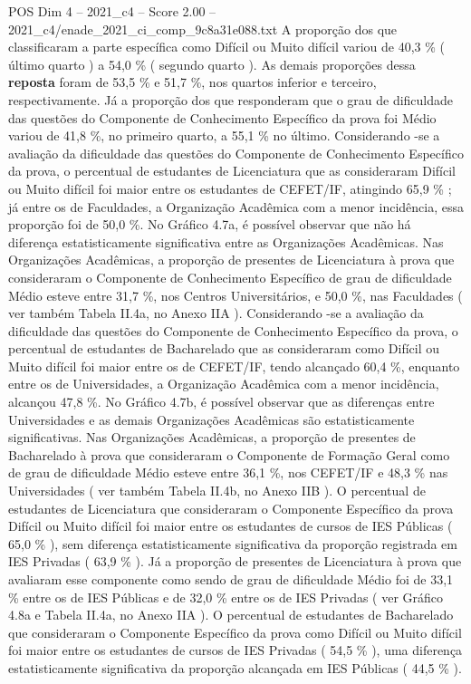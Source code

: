 \begin{textsample}{POS Dim 4 – 2021\_c4 – Score 2.00 – 2021\_c4/enade\_2021\_ci\_comp\_9c8a31e088.txt}
A proporção dos que classificaram a parte específica como Difícil ou Muito difícil variou de 40,3 \% ( último quarto ) a 54,0 \% ( segundo quarto ).
As demais proporções dessa \textbf{reposta} foram de 53,5 \% e 51,7 \%, nos quartos inferior e terceiro, respectivamente.
Já a proporção dos que responderam que o grau de dificuldade das questões do Componente de Conhecimento Específico da prova foi Médio variou de 41,8 \%, no primeiro quarto, a 55,1 \% no último.
Considerando -se a avaliação da dificuldade das questões do Componente de Conhecimento Específico da prova, o percentual de estudantes de Licenciatura que as consideraram Difícil ou Muito difícil foi maior entre os estudantes de CEFET/IF, atingindo 65,9 \% ; já entre os de Faculdades, a Organização Acadêmica com a menor incidência, essa proporção foi de 50,0 \%.
No Gráfico 4.7a, é possível observar que não há diferença estatisticamente significativa entre as Organizações Acadêmicas.
Nas Organizações Acadêmicas, a proporção de presentes de Licenciatura à prova que consideraram o Componente de Conhecimento Específico de grau de dificuldade Médio esteve entre 31,7 \%, nos Centros Universitários, e 50,0 \%, nas Faculdades ( ver também Tabela II.4a, no Anexo IIA ).
Considerando -se a avaliação da dificuldade das questões do Componente de Conhecimento Específico da prova, o percentual de estudantes de Bacharelado que as consideraram como Difícil ou Muito difícil foi maior entre os de CEFET/IF, tendo alcançado 60,4 \%, enquanto entre os de Universidades, a Organização Acadêmica com a menor incidência, alcançou 47,8 \%.
No Gráfico 4.7b, é possível observar que as diferenças entre Universidades e as demais Organizações Acadêmicas são estatisticamente significativas.
Nas Organizações Acadêmicas, a proporção de presentes de Bacharelado à prova que consideraram o Componente de Formação Geral como de grau de dificuldade Médio esteve entre 36,1 \%, nos CEFET/IF e 48,3 \% nas Universidades ( ver também Tabela II.4b, no Anexo IIB ).
O percentual de estudantes de Licenciatura que consideraram o Componente Específico da prova Difícil ou Muito difícil foi maior entre os estudantes de cursos de IES Públicas ( 65,0 \% ), sem diferença estatisticamente significativa da proporção registrada em IES Privadas ( 63,9 \% ).
Já a proporção de presentes de Licenciatura à prova que avaliaram esse componente como sendo de grau de dificuldade Médio foi de 33,1 \% entre os de IES Públicas e de 32,0 \% entre os de IES Privadas ( ver Gráfico 4.8a e Tabela II.4a, no Anexo IIA ).
O percentual de estudantes de Bacharelado que consideraram o Componente Específico da prova como Difícil ou Muito difícil foi maior entre os estudantes de cursos de IES Privadas ( 54,5 \% ), uma diferença estatisticamente significativa da proporção alcançada em IES Públicas ( 44,5 \% ).

\end{textsample}
